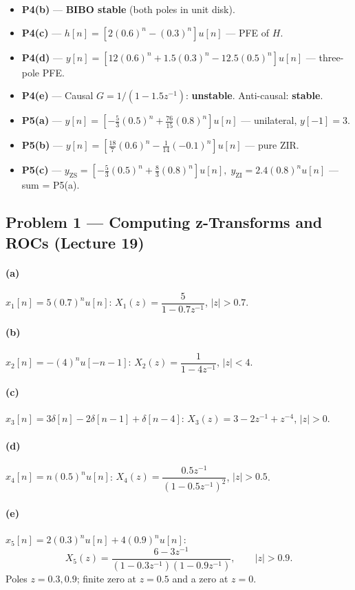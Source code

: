 \documentclass[11pt]{article}
\begin{document}
\begin{itemize}[leftmargin=*, nosep]
  \item \textbf{P4(b)} --- \textbf{BIBO stable} (both poles in unit disk).
  \item \textbf{P4(c)} --- $\boxed{h[n] = [2(0.6)^n - (0.3)^n]u[n]}$ --- PFE of $H$.
  \item \textbf{P4(d)} --- $\boxed{y[n] = [12(0.6)^n + 1.5(0.3)^n - 12.5(0.5)^n]u[n]}$ --- three-pole PFE.
  \item \textbf{P4(e)} --- Causal $G=1/(1-1.5z^{-1})$: \textbf{unstable}. Anti-causal: \textbf{stable}.
  \item \textbf{P5(a)} --- $\boxed{y[n] = [-\tfrac{5}{3}(0.5)^n + \tfrac{76}{15}(0.8)^n]u[n]}$ --- unilateral, $y[-1]=3$.
  \item \textbf{P5(b)} --- $\boxed{y[n] = [\tfrac{18}{7}(0.6)^n - \tfrac{1}{14}(-0.1)^n]u[n]}$ --- pure ZIR.
  \item \textbf{P5(c)} --- $\boxed{y_{\text{ZS}}=[-\tfrac{5}{3}(0.5)^n+\tfrac{8}{3}(0.8)^n]u[n],\; y_{\text{ZI}}=2.4(0.8)^n u[n]}$ --- sum = P5(a).
\end{itemize}

\subsection{Problem 1 --- Computing z-Transforms and ROCs (Lecture 19)}

\paragraph{(a)} $x_1[n]=5(0.7)^n u[n]$: $X_1(z) = \dfrac{5}{1-0.7 z^{-1}}$, $|z|>0.7$.

\paragraph{(b)} $x_2[n]=-(4)^n u[-n-1]$: $X_2(z) = \dfrac{1}{1-4 z^{-1}}$, $|z|<4$.

\paragraph{(c)} $x_3[n]=3\delta[n]-2\delta[n-1]+\delta[n-4]$: $X_3(z) = 3 - 2z^{-1} + z^{-4}$, $|z|>0$.

\paragraph{(d)} $x_4[n]=n(0.5)^n u[n]$: $X_4(z) = \dfrac{0.5 z^{-1}}{(1-0.5 z^{-1})^2}$, $|z|>0.5$.

\paragraph{(e)} $x_5[n]=2(0.3)^n u[n] + 4(0.9)^n u[n]$:
\[
X_5(z) = \frac{6 - 3 z^{-1}}{(1-0.3 z^{-1})(1-0.9 z^{-1})}, \qquad |z|>0.9.
\]
Poles $z=0.3, 0.9$; finite zero at $z=0.5$ and a zero at $z=0$.
\end{document}
